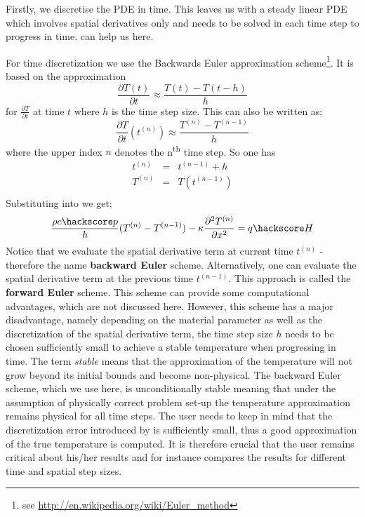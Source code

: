 Firstly, we discretise the PDE  in time. This leaves us with a steady linear PDE which involves spatial derivatives only and needs to be solved in each time step to progress in time. \esc can help us here.

For time discretization we use the Backwards Euler approximation scheme\footnote{see \url{http://en.wikipedia.org/wiki/Euler_method}}. It is based on the
approximation 
\begin{equation}
\frac{\partial T(t)}{\partial t} \approx \frac{T(t)-T(t-h)}{h}
\label{eqn:beuler}
\end{equation}
for  $\frac{\partial T}{\partial t}$  at time $t$ 
where $h$ is the time step size. This can also be written as;
\begin{equation}
\frac{\partial T}{\partial t}(t^{(n)}) \approx \frac{T^{(n)} - T^{(n-1)}}{h}
\label{eqn:Tbeuler}
\end{equation}
where the upper index $n$ denotes the n\textsuperscript{th} time step. So one has
\begin{equation}
\begin{array}{rcl}
t^{(n)} & = & t^{(n-1)}+h \\
T^{(n)} & = & T(t^{(n-1)}) \\ 
\end{array}
\label{eqn:Neuler}
\end{equation}
Substituting  into  we get;
\begin{equation}
\frac{\rho c\hackscore p}{h} (T^{(n)} - T^{(n-1)}) - \kappa \frac{\partial^{2} T^{(n)}}{\partial x^{2}} = q\hackscore H 
\label{eqn:hddisc}
\end{equation}
Notice that we evaluate the spatial derivative term at current time $t^{(n)}$ - therefore the name \textbf{backward Euler} scheme. Alternatively, one can evaluate the spatial derivative term at the previous time $t^{(n-1)}$. This 
approach is called the \textbf{forward Euler} scheme. This scheme can provide some computational advantages, which
are not discussed here. However, this scheme has a major disadvantage, namely depending on the 
material parameter as well as the discretization of the spatial derivative term, the time step size $h$ needs to be chosen sufficiently small to achieve a stable temperature when progressing in time. The term \textit{stable} means
that the approximation of the temperature will not grow beyond its initial bounds and become non-physical. 
The backward Euler scheme, which we use here, is unconditionally stable meaning that under the assumption of
physically correct problem set-up the temperature approximation remains physical for all time steps. 
The user needs to keep in mind that the discretization error introduced by  
is sufficiently small, thus a good approximation of the true temperature is computed. It is
therefore crucial that the user remains critical about his/her results and for instance compares 
the results for different time and spatial step sizes. 

